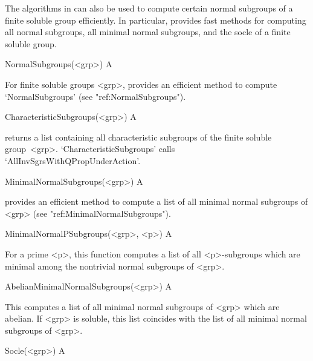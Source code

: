 
The algorithms in {\CRISP} can also be used to compute certain normal subgroups of a finite soluble
group efficiently. In particular, {\CRISP} provides fast methods for computing all normal subgroups, all minimal normal subgroups, and the socle of a finite soluble group.


\null

\>NormalSubgroups(<grp>) A

For finite soluble groups <grp>, {\CRISP} provides an efficient method to compute `NormalSubgroups' (see "ref:NormalSubgroups"). 

\>CharacteristicSubgroups(<grp>) A

returns a list containing all characteristic subgroups of the finite soluble group~<grp>. 
`CharacteristicSubgroups' calls `AllInvSgrsWithQPropUnderAction'.

\>MinimalNormalSubgroups(<grp>) A

\relax
{\CRISP} provides an efficient method to compute a list of all minimal normal subgroups of <grp> (see "ref:MinimalNormalSubgroups"). 


\>MinimalNormalPSubgroups(<grp>, <p>) A

\relax
For a prime <p>, this function computes a list of all <p>-subgroups which are minimal among the nontrivial
normal subgroups of <grp>. 

\>AbelianMinimalNormalSubgroups(<grp>) A

\relax
This computes a list of all minimal normal subgroups of <grp> which are abelian. If <grp> is soluble, this list coincides with the list of all
minimal normal subgroups of <grp>.

\null

\>Socle(<grp>) A

